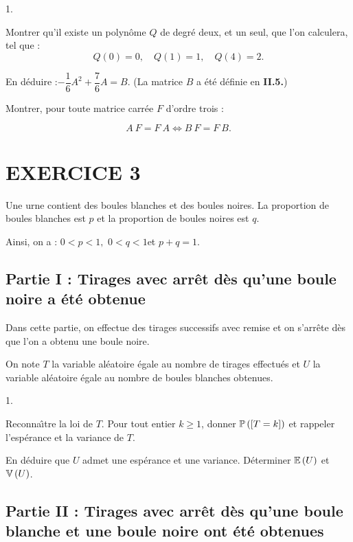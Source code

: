 \documentclass[11pt]{article}%
\begin{document}
\begin{noliste}{1.}
 \setlength{\itemsep}{4mm}
\item Montrer qu'il existe un polyn\^{o}me $Q$ de degré deux, et un
seul, que l'on calculera, tel que :
\[
Q\left( 0\right) = 0,\quad Q\left( 1\right) = 1,\quad Q\left( 4\right)
= 2.
\]

\item En déduire :\texttt{\hspace*{1cm}}$-\dfrac{1}{6}A^{2} +
\dfrac{7}{6}A = B$. (La matrice $B$ a été définie en \textbf{II.5.})

\item Montrer, pour toute matrice carrée $F$ d'ordre trois :{}
\end{noliste}

\[
A~F = F~A\Longleftrightarrow B~F = F~B.
\]

\section*{EXERCICE 3}

Une urne contient des boules blanches et des boules noires. La
proportion de
boules blanches est $p$ et la proportion de boules noires est $q$.

Ainsi, on a : $0<p<1,$ $0<q<1$et $p + q = 1$.

\subsection*{Partie I : Tirages avec arrêt dès qu'une boule noire a 
été obtenue}

Dans cette partie, on effectue des tirages successifs avec remise et on
s'arrête dès que l'on a obtenu une boule noire.

On note $T$ la variable aléatoire égale au nombre de tirages effectués
et $U$ la variable aléatoire égale au nombre de boules
blanches obtenues.

\begin{noliste}{1.}
 \setlength{\itemsep}{4mm}
\item Reconna\^{\i}tre la loi de $T$. Pour tout entier $k\geq 1$,
donner $\mathbb{P}\left(\left[ { T = k} \right]\right) $ et rappeler l'espérance et la
variance de $T$.

\item En déduire que $U$ admet une espérance et une variance.
Déterminer $\mathbb{E}\left( U\right) $ et $\mathbb{V}\left( U\right) $.
\end{noliste}

\subsection*{Partie II : Tirages avec arrêt dès qu'une boule blanche
et une boule noire ont été obtenues}
\end{document}
